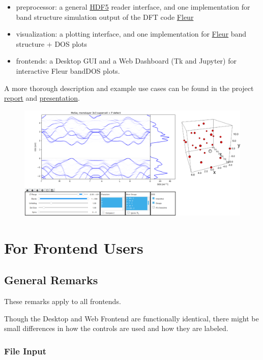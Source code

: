 \begin{itemize}
    \tightlist
\item
    preprocessor: a general
    \href{https://www.hdfgroup.org/solutions/hdf5/}{HDF5} reader interface, and
    one implementation for band structure simulation output of the DFT code \href{http://www.judft.de}{Fleur}
\item
    visualization: a plotting interface, and one implementation for
    \href{http://www.judft.de}{Fleur} band structure + DOS plots
\item
    frontends: a Desktop GUI and a Web Dashboard (Tk and Jupyter) for
    interactive Fleur bandDOS plots.
\end{itemize}

A more thorough description and example use cases can be found in the
project \href{./doc/report.pdf}{report} and
\href{./doc/presentation.pdf}{presentation}.

\begin{figure}
    \centering
    \includegraphics{./readme/web_frontend.png}
\end{figure}

\section{For Frontend Users}\label{for-frontend-users}

\subsection{General Remarks}\label{general-remarks}

These remarks apply to all frontends.

Though the Desktop and Web Frontend are functionally identical, there
might be small differences in how the controls are used and how they are
labeled.

\subsubsection{File Input}\label{file-input}

